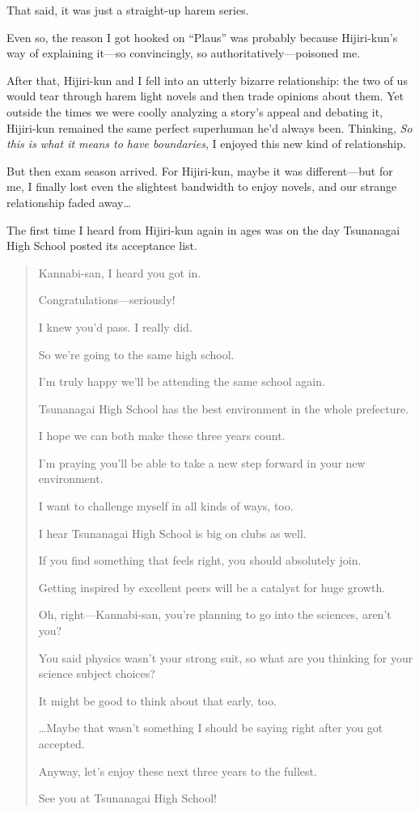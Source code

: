 \documentclass[
    a4paper,
    12pt,
    twoside,
    openany,
    UTF8,
    fontset=windows
]{ctexbook}
\begin{document}
That said, it was just a straight-up harem series.

Even so, the reason I got hooked on ``Plaus'' was probably because Hijiri-kun's way of explaining it---so convincingly, so authoritatively---poisoned me.

After that, Hijiri-kun and I fell into an utterly bizarre relationship: the two of us would tear through harem light novels and then trade opinions about them. Yet outside the times we were coolly analyzing a story's appeal and debating it, Hijiri-kun remained the same perfect superhuman he'd always been. Thinking, \textit{So this is what it means to have boundaries}, I enjoyed this new kind of relationship.

But then exam season arrived. For Hijiri-kun, maybe it was different---but for me, I finally lost even the slightest bandwidth to enjoy novels, and our strange relationship faded away\dots

The first time I heard from Hijiri-kun again in ages was on the day Tsunanagai High School posted its acceptance list.

\begin{quote}
Kannabi-san, I heard you got in.

Congratulations---seriously!

I knew you'd pass. I really did.

So we're going to the same high school.

I'm truly happy we'll be attending the same school again.

Tsunanagai High School has the best environment in the whole prefecture.

I hope we can both make these three years count.

I'm praying you'll be able to take a new step forward in your new environment.

I want to challenge myself in all kinds of ways, too.

I hear Tsunanagai High School is big on clubs as well.

If you find something that feels right, you should absolutely join.

Getting inspired by excellent peers will be a catalyst for huge growth.

Oh, right---Kannabi-san, you're planning to go into the sciences, aren't you?

You said physics wasn't your strong suit, so what are you thinking for your science subject choices?

It might be good to think about that early, too.

\dots Maybe that wasn't something I should be saying right after you got accepted.

Anyway, let's enjoy these next three years to the fullest.

See you at Tsunanagai High School!
\end{quote}
\end{document}
